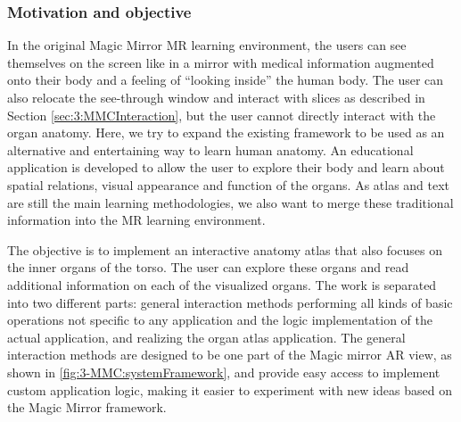 \subsubsection{Motivation and objective}
In the original Magic Mirror MR learning environment, the users can see themselves on the screen like in a mirror with medical information augmented onto their body and a feeling of ``looking inside'' the human body. The user can also relocate the see-through window and interact with slices as described in Section \ref{sec:3:MMCInteraction}, but the user cannot directly interact with the organ anatomy. Here, we try to expand the existing framework to be used as an alternative and entertaining way to learn human anatomy. An educational application is developed to allow the user to explore their body and learn about spatial relations, visual appearance and function of the organs.
As atlas and text are still the main learning methodologies, we also want to merge these traditional information into the MR learning environment. 

The objective is to implement an interactive anatomy atlas that also focuses on the inner organs of the torso. The user can explore these organs and read additional information on each of the visualized organs. The work is separated into two different parts: general interaction methods performing all kinds of basic operations not specific to any application and the logic implementation of the actual application, and realizing the organ atlas application.
The general interaction methods are designed to be one part of the Magic mirror AR view, as shown in \figurename{\ref{fig:3-MMC:systemFramework}}, and provide easy access to implement custom application logic, making it easier to experiment with new ideas based on the Magic Mirror framework.

